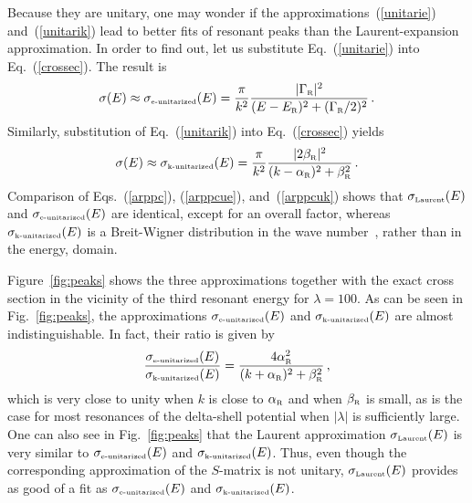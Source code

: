 \documentclass[12pt]{article}
\newcommand{\gr}{\Gamma _{\text{\tiny R}}}
\newcommand{\er}{E_{\text{\tiny R}}}
\newcommand{\ar}{\alpha_{\text{\tiny R}}}
\newcommand{\br}{\beta_{\text{\tiny R}}}
\begin{document}
Because they are unitary, one may wonder if the 
approximations~(\ref{unitarie}) and~(\ref{unitarik}) lead to better
fits of resonant peaks than the Laurent-expansion approximation. In order
to find out, let us substitute Eq.~(\ref{unitarie}) into 
Eq.~(\ref{crossec}). The result is
\begin{equation}
      \sigma (E)\approx \sigma_{\text{\tiny e-unitarized}}(E)= \frac{\pi}{k^2} 
\frac{|\gr|^2}{(E-\er)^2+(\gr/2)^2} \, .
        \label{arppcue}
\end{equation}
Similarly, substitution of Eq.~(\ref{unitarik}) into Eq.~(\ref{crossec})
yields
\begin{equation}
      \sigma (E)\approx \sigma_{\text{\tiny k-unitarized}}(E)= \frac{\pi}{k^2} 
\frac{|2\br|^2}{(k-\ar)^2+\br ^2} \, .
        \label{arppcuk}
\end{equation}
Comparison of Eqs.~(\ref{arppc}), (\ref{arppcue}), and~(\ref{arppcuk})
shows that $\sigma_{\text{\tiny Laurent}}(E)$ and $\sigma_{\text{\tiny e-unitarized}}(E)$
are identical, except for an overall factor, whereas 
$\sigma_{\text{\tiny k-unitarized}}(E)$ is a Breit-Wigner distribution in the
wave number~\cite{BWM}, rather than in the energy, domain.

Figure~\ref{fig:peaks} shows the three approximations together with
the exact cross section in the vicinity of the third resonant energy for
$\lambda =100$. As can be seen in Fig.~\ref{fig:peaks}, the approximations
$\sigma_{\text{\tiny e-unitarized}}(E)$ and $\sigma_{\text{\tiny k-unitarized}}(E)$ are 
almost indistinguishable. In fact, their ratio is given by
\begin{equation}
     \frac{\sigma_{\text{\tiny e-unitarized}}(E)}{\sigma_{\text{\tiny k-unitarized}}(E)}
        = \frac{4\ar ^2}{(k+\ar )^2+\br ^2} \, ,
\end{equation}
which is very close to unity when $k$ is close to $\ar$ and when $\br$ is 
small, as is the case for most resonances of the delta-shell potential when
$|\lambda|$ is sufficiently large. One can also see in Fig.~\ref{fig:peaks} 
that the Laurent approximation $\sigma_{\text{\tiny Laurent}}(E)$ is very similar to
$\sigma_{\text{\tiny e-unitarized}}(E)$ and $\sigma_{\text{\tiny k-unitarized}}(E)$. Thus,
even though the corresponding approximation of the $S$-matrix is not 
unitary, $\sigma_{\text{\tiny Laurent}}(E)$ provides as good of a fit as
$\sigma_{\text{\tiny e-unitarized}}(E)$ and $\sigma_{\text{\tiny k-unitarized}}(E)$.
\end{document}
